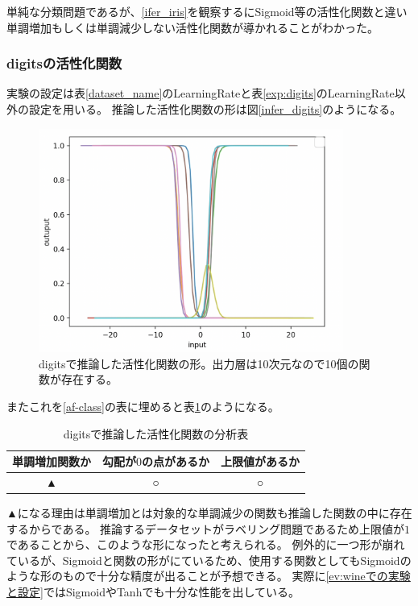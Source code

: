 単純な分類問題であるが、\ref{ifer_iris}を観察するにSigmoid等の活性化関数と違い単調増加もしくは単調減少しない活性化関数が導かれることがわかった。




\subsubsection{digitsの活性化関数}
実験の設定は表\ref{dataset_name}のLearningRateと表\ref{exp:digits}のLearningRate以外の設定を用いる。
推論した活性化関数の形は図\ref{infer_digits}のようになる。
\begin{figure}[hbtp]
    \begin{center}
        \includegraphics[width=10cm]{asset/digits-0.1.png}
            \caption{digitsで推論した活性化関数の形。出力層は10次元なので10個の関数が存在する。}
            \label{ifer_digits}
    \end{center}
\end{figure}

またこれを\ref{af-class}の表に埋めると表\ref{anal_digits}のようになる。
\begin{table}[htbp]
    \begin{center}
        \caption{digitsで推論した活性化関数の分析表}
        \label{anal_digits}
        \vspace{2mm} 
        \begin{tabular}{ |c|c|c| }
        単調増加関数か & 勾配が$ 0 $の点があるか & 上限値があるか   \\
        \hline
        ▲ & ○ & ○   \\
        \end{tabular}
    \end{center}
\end{table}

▲になる理由は単調増加とは対象的な単調減少の関数も推論した関数の中に存在するからである。
推論するデータセットがラベリング問題であるため上限値が$ 1 $であることから、このような形になったと考えられる。
例外的に一つ形が崩れているが、Sigmoidと関数の形がにているため、使用する関数としてもSigmoidのような形のもので十分な精度が出ることが予想できる。
実際に\ref{ev:wineでの実験と設定}ではSigmoidやTanhでも十分な性能を出している。


